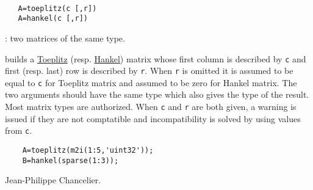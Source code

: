 
\begin{mandesc}
  \\ %
\end{mandesc}
\begin{calling_sequence}
\begin{verbatim}
   A=toeplitz(c [,r])   
   A=hankel(c [,r])   
\end{verbatim}
\end{calling_sequence}
\begin{parameters}
  \begin{varlist}
    : two matrices of the same type. 
  \end{varlist}
\end{parameters}
\begin{mandescription}
  builds a \href{http://en.wikipedia.org/wiki/Toeplitz_matrix}{Toeplitz}
  (resp. \href{http://en.wikipedia.org/wiki/Hankel_matrix}{Hankel})
  matrix whose first column is described 
  by \verb+c+ and first (resp. last) row is described by \verb+r+. 
  When \verb+r+ is omitted it is assumed to be equal to \verb+c+ for Toeplitz
  matrix and assumed to be zero for Hankel matrix. 
  The two arguments should have the same type which also gives the type of 
  the result. Most matrix types are authorized. 
  When \verb+c+ and \verb+r+ are both given, a warning is issued if they are 
  not comptatible and incompatibility is solved by using values from \verb+c+. 
\end{mandescription}
\begin{examples}
  \begin{Verbatim}
    A=toeplitz(m2i(1:5,'uint32'));
    B=hankel(sparse(1:3));
  \end{Verbatim}
\end{examples}
\begin{authors}
  Jean-Philippe Chancelier. 
\end{authors}

